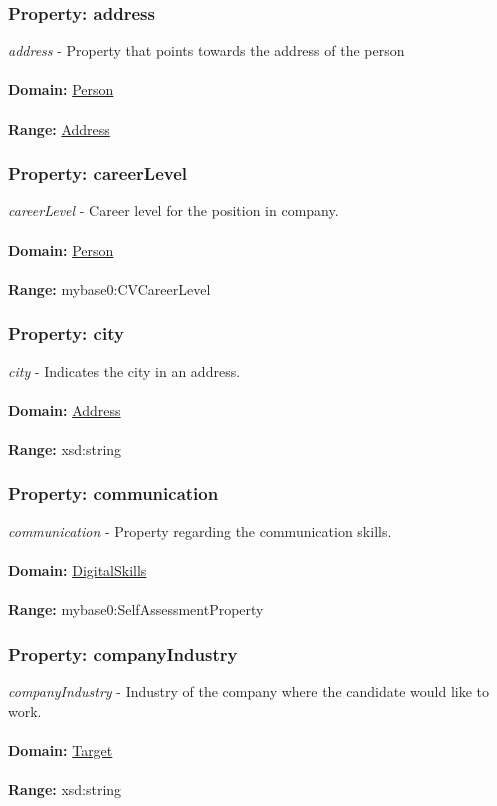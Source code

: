 \documentclass[a4paper,12pt]{article}
\numberwithin{equation}{section}
\begin{document}
\subsubsection{Property: address}\hypertarget{address}{}
\textit{address} - Property that points towards the address of the person
\\\\
\textbf{Domain:} \hyperlink{Person}{Person} 
\\\\
\textbf{Range:}  \hyperlink{Address}{Address} 

\subsubsection{Property: careerLevel}\hypertarget{careerLevel}{}
\textit{careerLevel} - Career level for the position in company.
\\\\
\textbf{Domain:} \hyperlink{Person}{Person} 
\\\\
\textbf{Range:}  mybase0:CVCareerLevel

\subsubsection{Property: city}\hypertarget{city}{}
\textit{city} - Indicates the city in an address.
\\\\
\textbf{Domain:} \hyperlink{Address}{Address}
\\\\
\textbf{Range:}  xsd:string

\subsubsection{Property: communication}\hypertarget{communication}{}
\textit{communication} - Property regarding the communication skills.
\\\\
\textbf{Domain:} \hyperlink{DigitalSkills}{DigitalSkills} 
\\\\
\textbf{Range:}  mybase0:SelfAssessmentProperty

\subsubsection{Property: companyIndustry}\hypertarget{companyIndustry}{}
\textit{companyIndustry} - Industry of the company where the candidate would like to work.
\\\\
\textbf{Domain:} \hyperlink{Target}{Target} 
\\\\
\textbf{Range:}  xsd:string
\end{document}
